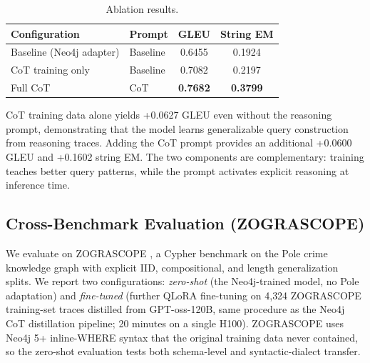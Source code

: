 \documentclass[11pt]{article}
\begin{document}
\begin{table}[h]
\centering
\caption{Ablation results.}
\label{tab:ablation}
\begin{tabular}{llcc}
\toprule
\textbf{Configuration} & \textbf{Prompt} & \textbf{GLEU} & \textbf{String EM} \\
\midrule
Baseline (Neo4j adapter) & Baseline & 0.6455 & 0.1924 \\
CoT training only & Baseline & 0.7082 & 0.2197 \\
Full CoT & CoT & \textbf{0.7682} & \textbf{0.3799} \\
\bottomrule
\end{tabular}
\end{table}

CoT training data alone yields +0.0627 GLEU even without the reasoning prompt, demonstrating that the model learns generalizable query construction from reasoning traces. Adding the CoT prompt provides an additional +0.0600 GLEU and +0.1602 string EM. The two components are complementary: training teaches better query patterns, while the prompt activates explicit reasoning at inference time.

\subsection{Cross-Benchmark Evaluation (ZOGRASCOPE)}

We evaluate on ZOGRASCOPE \citep{zograscope2025}, a Cypher benchmark on the Pole crime knowledge graph with explicit IID, compositional, and length generalization splits. We report two configurations: \emph{zero-shot} (the Neo4j-trained model, no Pole adaptation) and \emph{fine-tuned} (further QLoRA fine-tuning on 4{,}324 ZOGRASCOPE training-set traces distilled from GPT-oss-120B, same procedure as the Neo4j CoT distillation pipeline; 20 minutes on a single H100). ZOGRASCOPE uses Neo4j 5+ inline-WHERE syntax that the original training data never contained, so the zero-shot evaluation tests both schema-level and syntactic-dialect transfer.
\end{document}
